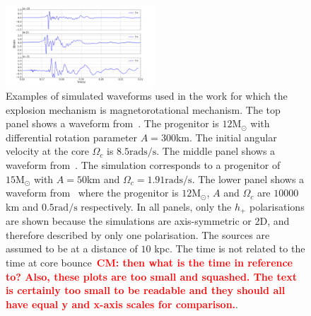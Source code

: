 \documentclass[aps,twocolumn,showpacs,groupedaddress, nofootinbib]{revtex4}  %
\newcommand{\cm}[1]{\textbf{\textcolor{red}{CM: #1}}}
\begin{document}

\begin{figure}
\includegraphics[width=0.5\textwidth]{mag_waveforms.png}
\caption{Examples of simulated waveforms used in the work for which the
explosion mechanism is magnetorotational mechanism.  The top panel shows a
waveform from~\cite{abdikamalov2014measuring}. The progenitor is
$12\text{M}_\odot$ with differential rotation parameter $A=300\text{km}$. The
initial angular velocity at the core $\Omega_c$ is $8.5\text{rads/s}$. The
middle panel shows a waveform from~\cite{dimmelmeier2008gravitational}. The
simulation corresponds to a progenitor of $15\text{M}_\odot$ with $A=50$km and
$\Omega_c = 1.91\text{rads/s}$.  The lower panel shows a waveform
from~\cite{richers2017equation} where the progenitor is $12\text{M}_\odot$, $A$
and $\Omega_c$ are $10000$km and $0.5\text{rad/s}$ respectively. In all panels,
only the $h_{+}$ polarisations are shown because the simulations are
axis-symmetric or 2D, and therefore described by only one polarisation.  The
sources are assumed to be at a distance of $10$ kpc. The time is not related to
the time at core bounce~\cm{then what is the time in reference to? Also, these
plots are too small and squashed. The text is certainly too small to be
readable and they should all have equal y and x-axis scales for comparison.}.
\label{fig:magwaveforms}} 
\end{figure}
\end{document}

